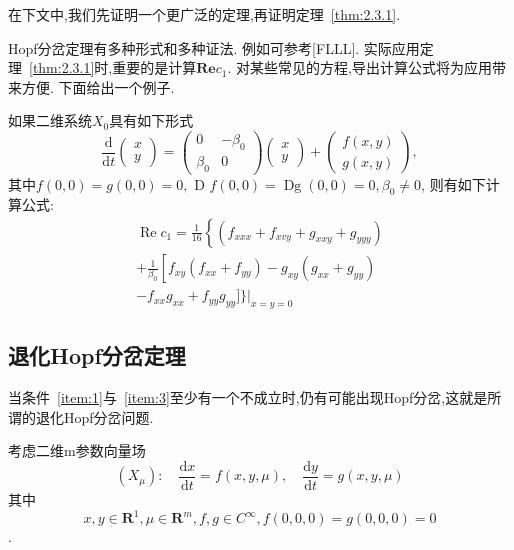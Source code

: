 在下文中,我们先证明一个更广泛的定理,再证明定理~\ref{thm:2.3.1}.

\begin{corollary}
  \label{corollary:2.3.2}
  Hopf分岔定理有多种形式和多种证法.
  例如可参考[FLLL].
  实际应用定理~\ref{thm:2.3.1}时,重要的是计算$\mathbf{R e}c_{1}$.
  对某些常见的方程,导出计算公式将为应用带来方便.
  下面给出一个例子.
\end{corollary}

\begin{example}[GH]
  \label{example:2.3.3}
  如果二维系统$X_{0}$具有如下形式
  $$
\frac{\mathrm{d}}{\mathrm{d} t}\left(\begin{array}{l}{x} \\ {y}\end{array}\right)=\left(\begin{array}{cc}{0} & {-\beta_{0}} \\ {\beta_{0}} & {0}\end{array}\right)\left(\begin{array}{l}{x} \\ {y}\end{array}\right)+\left(\begin{array}{l}{f(x, y)} \\ {g(x, y)}\end{array}\right),
$$
其中$f(0,0)=g(0,0)=0,$ D $f(0,0)=\operatorname{Dg}(0,0)=0, \beta_{0} \neq 0$,
则有如下计算公式:
\begin{equation}
  \label{eq:2.3.3}
  \begin{array}{l}
    \operatorname{Re} c_{1}=\frac{1}{16}\left\{\left(f_{x x x}+f_{x v y}+g_{x x y}+g_{y y y}\right)\right.\\
    {+\frac{1}{\beta_{0}}\left[f_{x y}\left(f_{x x}+f_{y y}\right)-g_{x y}\left(g_{x x}+g_{y y}\right)\right.} \\
    {-f_{x x} g_{x x}+f_{y y} g_{y y} ]\left.\}\right|_{x=y=0}}
  \end{array}
\end{equation}
\end{example}

\subsection{退化Hopf分岔定理}
\label{sec:2.3.2}

当条件~\ref{item:1}与\label{sec:hopf}~\ref{item:3}至少有一个不成立时,仍有可能出现Hopf分岔,这就是所谓的退化Hopf分岔问题.

考虑二维m参数向量场
\begin{equation}
  \label{eq:2.3.4}
\left(X_{\mu}\right) : \quad \frac{\mathrm{d} x}{\mathrm{d} t}=f(x, y, \mu), \quad \frac{\mathrm{d} y}{\mathrm{d} t}=g(x, y, \mu)
\end{equation}
其中$$
x, y \in \mathbf{R}^{1}, \mu \in \mathbf{R}^{m}, f, g \in C^{\infty}, f(0,0,0)=g(0,0,0)=0
$$.

